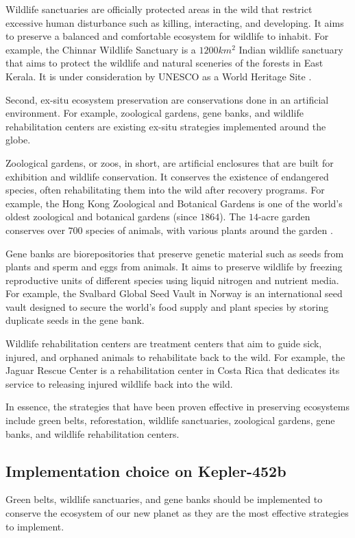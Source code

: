 \documentclass{article}
\begin{document}
Wildlife sanctuaries are officially protected areas in the wild that restrict excessive human disturbance such as killing, interacting, and developing. It aims to preserve a balanced and comfortable ecosystem for wildlife to inhabit. For example, the Chinnar Wildlife Sanctuary is a $1200km^{2}$ Indian wildlife sanctuary that aims to protect the wildlife and natural sceneries of the forests in East Kerala. It is under consideration by UNESCO as a World Heritage Site \cite{cite3}. 
 
Second, ex-situ ecosystem preservation are conservations done in an artificial environment. For example, zoological gardens, gene banks, and wildlife rehabilitation centers are existing ex-situ strategies implemented around the globe. 
 
Zoological gardens, or zoos, in short, are artificial enclosures that are built for exhibition and wildlife conservation. It conserves the existence of endangered species, often rehabilitating them into the wild after recovery programs. For example, the Hong Kong Zoological and Botanical Gardens is one of the world's oldest zoological and botanical gardens (since $1864$). The $14$-acre garden conserves over $700$ species of animals, with various plants around the garden \cite{cite4}. 
 
Gene banks are biorepositories that preserve genetic material such as seeds from plants and sperm and eggs from animals. It aims to preserve wildlife by freezing reproductive units of different species using liquid nitrogen and nutrient media. For example, the Svalbard Global Seed Vault in Norway is an international seed vault designed to secure the world's food supply and plant species by storing duplicate seeds in the gene bank. 
 
Wildlife rehabilitation centers are treatment centers that aim to guide sick, injured, and orphaned animals to rehabilitate back to the wild. For example, the Jaguar Rescue Center is a rehabilitation center in Costa Rica that dedicates its service to releasing injured wildlife back into the wild. 
 
In essence, the strategies that have been proven effective in preserving ecosystems include green belts, reforestation, wildlife sanctuaries, zoological gardens, gene banks, and wildlife rehabilitation centers. 
 
\subsection{Implementation choice on Kepler-452b}
Green belts, wildlife sanctuaries, and gene banks should be implemented to conserve the ecosystem of our new planet as they are the most effective strategies to implement. 
 
\end{document}
